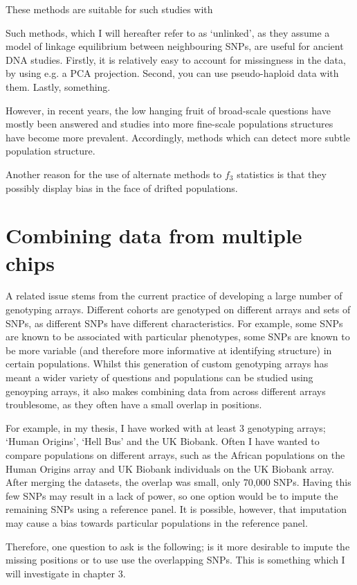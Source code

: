 These methods are suitable for such studies with

Such methods, which I will hereafter refer to as `unlinked', as they assume a model of linkage equilibrium between neighbouring SNPs, are useful for ancient DNA studies. Firstly, it is relatively easy to account for missingness in the data, by using e.g. a PCA projection. Second, you can use pseudo-haploid data with them. Lastly, something.

However, in recent years, the low hanging fruit of broad-scale questions have mostly been answered and studies into more fine-scale populations structures have become more prevalent. Accordingly, methods which can detect more subtle population structure.

Another reason for the use of alternate methods to $f_{3}$ statistics is that they possibly display bias in the face of drifted populations. 

\section{Combining data from multiple chips}

A related issue stems from the current practice of developing a large number of genotyping arrays. Different cohorts are genotyped on different arrays and sets of SNPs, as different SNPs have different characteristics. For example, some SNPs are known to be associated with particular phenotypes, some SNPs are known to be more variable (and therefore more informative at identifying structure) in certain populations. Whilst this generation of custom genotyping arrays has meant a wider variety of questions and populations can be studied using genoyping arrays, it also makes combining data from across different arrays troublesome, as they often have a small overlap in positions.

For example, in my thesis, I have worked with at least 3 genotyping arrays; `Human Origins', `Hell Bus' and the UK Biobank. Often I have wanted to compare populations on different arrays, such as the African populations on the Human Origins array and UK Biobank individuals on the UK Biobank array. After merging the datasets, the overlap was small, only 70,000 SNPs. Having this few SNPs may result in a lack of power, so one option would be to impute the remaining SNPs using a reference panel. It is possible, however, that imputation may cause a bias towards particular populations in the reference panel. 

Therefore, one question to ask is the following; is it more desirable to impute the missing positions or to use use the overlapping SNPs. This is something which I will investigate in chapter 3.

